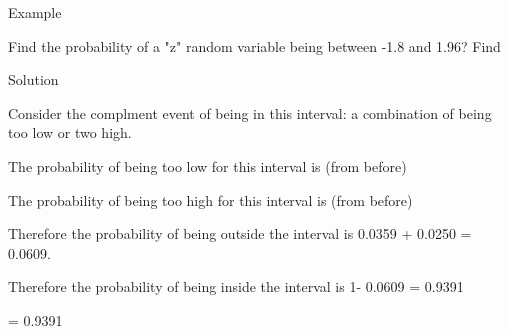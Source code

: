 \begin{frame}
Example 

Find the probability of a "z" random variable being between -1.8 and 1.96?
Find  

Solution 

Consider the complment event of being in this interval: a combination of being too low or two high. 

The probability of being too low for this interval is    (from before)

The probability of being too high for this interval is    (from before)

Therefore the probability of being outside the interval is  0.0359 + 0.0250 = 0.0609.

Therefore the probability of being inside the interval is 1- 0.0609 = 0.9391

  = 0.9391


\end{frame}
